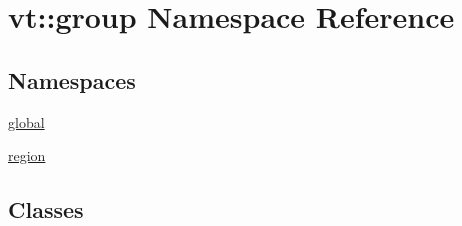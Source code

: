 \hypertarget{namespacevt_1_1group}{}\section{vt\+:\+:group Namespace Reference}
\label{namespacevt_1_1group}
\subsection*{Namespaces}
\begin{DoxyCompactItemize}
\item 
 \hyperlink{namespacevt_1_1group_1_1global}{global}
\item 
 \hyperlink{namespacevt_1_1group_1_1region}{region}
\end{DoxyCompactItemize}
\subsection*{Classes}
